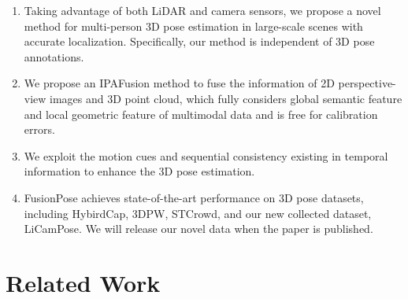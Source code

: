 \documentclass[letterpaper]{article} %
\begin{document}
\begin{enumerate}
\item Taking advantage of both LiDAR and camera sensors, we propose a novel method for multi-person 3D pose estimation in large-scale scenes with accurate localization. Specifically, our method is independent of 3D pose annotations.

\item We propose an IPAFusion method to fuse the information of 2D perspective-view images and 3D point cloud, which fully considers global semantic feature and local geometric feature of multimodal data and is free for calibration errors. 

\item We exploit the motion cues and sequential consistency existing in temporal information to enhance the 3D pose estimation.


\item FusionPose achieves state-of-the-art performance on 3D pose datasets, including HybirdCap, 3DPW, STCrowd, and our new collected dataset, LiCamPose. We will release our novel data when the paper is published.

\end{enumerate}
\section{Related Work}
\end{document}
